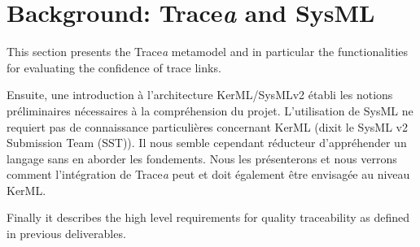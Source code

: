 \section{Background: Trace\textit{a} and SysML}\label{sec:background}






This section presents the Trace\textit{a} metamodel and in particular the functionalities for evaluating the confidence of trace links.   

Ensuite, une introduction à l'architecture KerML/SysMLv2 établi les notions préliminaires nécessaires à la compréhension du projet. L'utilisation de SysML ne requiert pas de connaissance particulières concernant KerML (dixit le SysML v2 Submission Team (SST)). Il nous semble cependant réducteur d'appréhender un langage sans en aborder les fondements. Nous les présenterons et nous verrons comment l'intégration de Trace\textit{a} peut et doit également être envisagée au niveau KerML.

Finally it describes the high level requirements for quality traceability as defined in previous deliverables.


